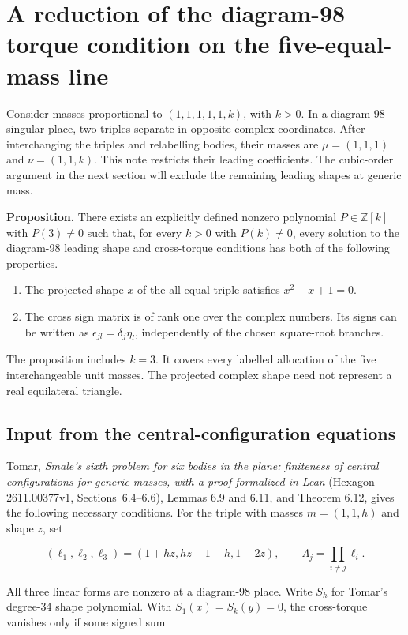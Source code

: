\documentclass[11pt]{article}
\begin{document}
\section{A reduction of the diagram-98 torque condition on the five-equal-mass line}

Consider masses proportional to \( (1,1,1,1,1,k) \), with \(k>0\). In a diagram-98 singular place, two triples separate in opposite complex coordinates. After interchanging the triples and relabelling bodies, their masses are \(\mu=(1,1,1)\) and \(\nu=(1,1,k)\). This note restricts their leading coefficients. The cubic-order argument in the next section will exclude the remaining leading shapes at generic mass.

\textbf{Proposition.} There exists an explicitly defined nonzero polynomial \(P\in\mathbb Z[k]\) with \(P(3)\ne0\) such that, for every \(k>0\) with \(P(k)\ne0\), every solution to the diagram-98 leading shape and cross-torque conditions has both of the following properties.

\begin{enumerate}
\item The projected shape \(x\) of the all-equal triple satisfies \(x^2-x+1=0\).
\item The cross sign matrix is of rank one over the complex numbers. Its signs can be written as \(\epsilon_{jl}=\delta_j\eta_l\), independently of the chosen square-root branches.
\end{enumerate}

The proposition includes \(k=3\). It covers every labelled allocation of the five interchangeable unit masses. The projected complex shape need not represent a real equilateral triangle.

\subsection*{Input from the central-configuration equations}

Tomar, \emph{Smale's sixth problem for six bodies in the plane: finiteness of central configurations for generic masses, with a proof formalized in Lean} (Hexagon 2611.00377v1, Sections~6.4--6.6), Lemmas 6.9 and 6.11, and Theorem 6.12, gives the following necessary conditions. For the triple with masses \(m=(1,1,h)\) and shape \(z\), set

\[
(\ell_1,\ell_2,\ell_3)=(1+hz,hz-1-h,1-2z),\qquad
\Lambda_j=\prod_{i\ne j}\ell_i.
\]

All three linear forms are nonzero at a diagram-98 place. Write \(S_h\) for Tomar's degree-34 shape polynomial. With \(S_1(x)=S_k(y)=0\), the cross-torque vanishes only if some signed sum
\end{document}
